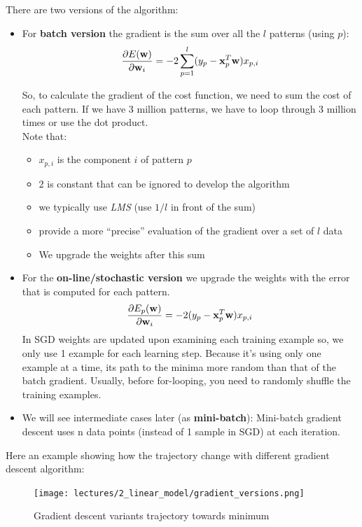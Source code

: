 \documentclass[../main.tex]{subfiles}
\begin{document}
There are two versions of the algorithm:
\begin{itemize}
    \item For \textbf{batch version} the gradient is the sum over all the $l$ patterns (using $p$):
$$\frac{\partial E(\mathbf{w})}{\partial\mathbf{w}_i} = -2\sum_{p = 1}^{l} (y_p - \bold{x}_p^T\bold{w})x_{p,i}$$

So, to calculate the gradient of the cost function, we need to sum the cost of each pattern. If we have 3 million patterns, we have to loop through 3 million times or use the dot product.\\
\noindent Note that:
\begin{itemize}
    \item $x_{p,i}$ is the component $i$ of pattern $p$
    \item $2$ is constant that can be ignored to develop the algorithm
    \item we typically use \emph{LMS} (use $1/l$ in front of the sum)
    \item provide a more “precise” evaluation of the gradient over a set of $l$ data
    \item We upgrade the weights after this sum
\end{itemize}

\item For the \textbf{on-line/stochastic version} we upgrade the weights with the error that is computed for each pattern.
$$\frac{\partial E_p(\mathbf{w})}{\partial\mathbf{w}_i} = -2(y_p - \bold{x}_p^T\bold{w})x_{p,i}$$
In SGD weights are updated upon examining each training example so, we only use 1 example for each learning step. Because it’s using only one example at a time, its path to the minima more random than that of the batch gradient. Usually, before for-looping, you need to randomly shuffle the training examples.
\item We will see intermediate cases later (as \textbf{mini-batch}): Mini-batch gradient descent uses n data points (instead of 1 sample in SGD) at each iteration.
\end{itemize}
Here an example showing how the trajectory change with different gradient descent algorithm:
\begin{figure}[H]
    \centering
    \texttt{[image: lectures/2\_linear\_model/gradient\_versions.png]}
    \caption{Gradient descent variants trajectory towards minimum}
    \label{fig:2_gradient_trajectory}
\end{figure}
\end{document}
